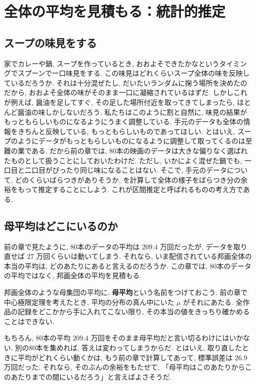 \section{全体の平均を見積もる：統計的推定}

  \subsection{スープの味見をする}

    家でカレーや鍋, スープを作っているとき, おおよそできたかなというタイミングでスプーンで一口味見をする.
    この味見はどれくらいスープ全体の味を反映しているだろうか.
    それは十分混ぜたし, だいたいランダムに掬う場所を決めたのだから, おおよそ全体の味がそのまま一口に凝縮されているはずだ.
    しかしこれが例えば, 醤油を足してすぐ, その足した場所付近を取ってきてしまったら, ほとんど醤油の味しかしないだろう.
    私たちはこのように割と自然に, 味見の結果がもっともらしいものになるようにうまく調整している.
    手元のデータも全体の情報をきちんと反映している, もっともらしいものであってほしい.
    とはいえ, スープのようにデータがもっともらしいものになるように調整して取ってくるのは至難の業である.
    だから前の章では, 80本の映画のデータは大きな偏りなく選ばれたものとして扱うことにしておいたわけだ.
    ただし, いかによく混ぜた鍋でも, 一口目と二口目がぴったり同じ味になることはない.
    そこで, 手元のデータについて, どのくらいばらつきがありそうか, を計算して全体の様子をばらつき分の余裕をもって推定することにしよう.
    これが区間推定と呼ばれるものの考え方である. 

  \subsection{母平均はどこにいるのか}

    前の章で見たように, 80本のデータの平均は $209.4$ 万回だったが, データを取り直せば $27$ 万回くらいは動いてしまう.
    それなら, いま配信されている邦画全体の本当の平均は, どのあたりにあると言えるのだろうか.
    この章では, 80本のデータの平均ではなく, 邦画全体の平均を見積もる.

    邦画全体のような母集団の平均に, \textbf{母平均}という名前をつけておこう.
    前の章で中心極限定理を考えたとき, 平均の分布の真ん中にいた $\mu$ がそれにあたる.
    全作品の記録をどこかから手に入れてこない限り, その本当の値をきっちり確かめることはできない.

    もちろん, 80本の平均 $209.4$ 万回をそのまま母平均だと言い切るわけにはいかない.
    別の80本を集めれば, 答えは変わってしまうからだ.
    とはいえ, 取り直したときに平均がどれくらい動くかは, もう前の章で計算してあって, 標準誤差は $26.9$ 万回だった.
    それなら, そのぶんの余裕をもたせて, 「母平均はこのあたりからこのあたりまでの間にいるだろう」と言えばよさそうだ.

